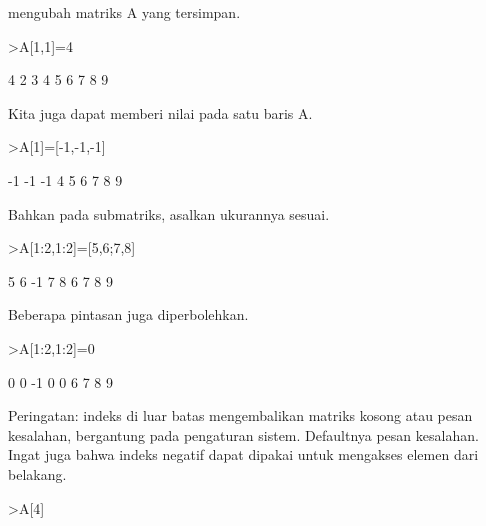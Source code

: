 \documentclass[a4paper,10pt]{article}
\begin{document}
\begin{eulernotebook}
\begin{eulercomment}
\begin{eulercomment}
\begin{eulercomment}
\begin{eulercomment}
\begin{eulercomment}
\begin{eulercomment}
\begin{eulercomment}
\begin{eulercomment}
\begin{eulercomment}
\begin{eulercomment}
\begin{eulercomment}
\begin{eulercomment}
\begin{eulercomment}
\begin{eulercomment}
\begin{eulercomment}
\begin{eulercomment}
\begin{eulercomment}
\begin{eulercomment}
\begin{eulercomment}
mengubah matriks A yang tersimpan.
\end{eulercomment}
\begin{eulerprompt}
>A[1,1]=4
\end{eulerprompt}
\begin{euleroutput}
              4             2             3 
              4             5             6 
              7             8             9 
\end{euleroutput}
\begin{eulercomment}
Kita juga dapat memberi nilai pada satu baris A.
\end{eulercomment}
\begin{eulerprompt}
>A[1]=[-1,-1,-1]
\end{eulerprompt}
\begin{euleroutput}
             -1            -1            -1 
              4             5             6 
              7             8             9 
\end{euleroutput}
\begin{eulercomment}
Bahkan pada submatriks, asalkan ukurannya sesuai.
\end{eulercomment}
\begin{eulerprompt}
>A[1:2,1:2]=[5,6;7,8]
\end{eulerprompt}
\begin{euleroutput}
              5             6            -1 
              7             8             6 
              7             8             9 
\end{euleroutput}
\begin{eulercomment}
Beberapa pintasan juga diperbolehkan.
\end{eulercomment}
\begin{eulerprompt}
>A[1:2,1:2]=0
\end{eulerprompt}
\begin{euleroutput}
              0             0            -1 
              0             0             6 
              7             8             9 
\end{euleroutput}
\begin{eulercomment}
Peringatan: indeks di luar batas mengembalikan matriks kosong atau pesan
kesalahan, bergantung pada pengaturan sistem. Defaultnya pesan kesalahan.
Ingat juga bahwa indeks negatif dapat dipakai untuk mengakses elemen dari
belakang.
\end{eulercomment}
\begin{eulerprompt}
>A[4]
\end{eulerprompt}

\end{eulercomment}
\end{eulercomment}
\end{eulercomment}
\end{eulercomment}
\end{eulercomment}
\end{eulercomment}
\end{eulercomment}
\end{eulercomment}
\end{eulercomment}
\end{eulercomment}
\end{eulercomment}
\end{eulercomment}
\end{eulercomment}
\end{eulercomment}
\end{eulercomment}
\end{eulercomment}
\end{eulercomment}
\end{eulercomment}
\end{eulernotebook}
\end{document}
